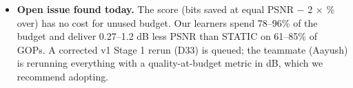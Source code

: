 \documentclass[10pt,a4paper]{article}
\begin{document}
\begin{itemize}
scene flags using later frames, case-level intervals, artificial splices) and re-tested every headline with
clip-level intervals, natural GOPs and per seed; built a causal environment; ran a learning curve; and ported the
pipeline to the team's leak-free dataset v1, where CQL$\to$PPO and Lagrangian beat the online controller by
+2.0 to +3.7 points.
\item \textbf{Open issue found today.} The score (bits saved at equal PSNR $-$ 2 $\times$ \% over) has no cost for
unused budget. Our learners spend 78--96\% of the budget and deliver 0.27--1.2 dB less PSNR than STATIC on 61--85\% of
GOPs. A corrected v1 Stage 1 rerun (D33) is queued; the teammate (Aayush) is rerunning everything with a
quality-at-budget metric in dB, which we recommend adopting.
\end{itemize}

\end{document}
